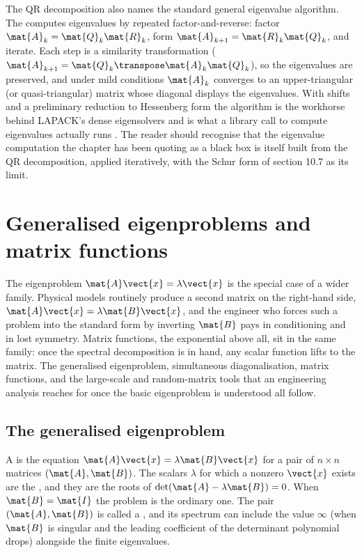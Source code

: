 The QR decomposition also names the standard general eigenvalue
algorithm. The  computes eigenvalues by
repeated factor-and-reverse: factor $\mat{A}_{k} = \mat{Q}_{k}
\mat{R}_{k}$, form $\mat{A}_{k+1} = \mat{R}_{k} \mat{Q}_{k}$, and
iterate. Each step is a similarity transformation ($\mat{A}_{k+1} =
\mat{Q}_{k}\transpose \mat{A}_{k} \mat{Q}_{k}$), so the eigenvalues
are preserved, and under mild conditions $\mat{A}_{k}$ converges to
an upper-triangular (or quasi-triangular) matrix whose diagonal
displays the eigenvalues. With shifts and a preliminary reduction to
Hessenberg form the algorithm is the workhorse behind LAPACK's dense
eigensolvers and is what a library call to compute eigenvalues
actually runs \cite[ch.~28-29]{text:trefethen-bau1997}. The reader
should recognise that the eigenvalue computation the chapter has
been quoting as a black box is itself built from the QR
decomposition, applied iteratively, with the Schur form of section
10.7 as its limit.

\section{Generalised eigenproblems and matrix functions}

The eigenproblem $\mat{A}\vect{x} = \lambda\vect{x}$ is the special
case of a wider family. Physical models routinely produce a second
matrix on the right-hand side, $\mat{A}\vect{x} = \lambda\mat{B}\vect{x}$,
and the engineer who forces such a problem into the standard form by
inverting $\mat{B}$ pays in conditioning and in lost symmetry. Matrix
functions, the exponential above all, sit in the same family: once the
spectral decomposition is in hand, any scalar function lifts to the
matrix. The generalised eigenproblem, simultaneous diagonalisation,
matrix functions, and the large-scale and random-matrix tools that an
engineering analysis reaches for once the basic eigenproblem is
understood all follow.

\subsection{The generalised eigenproblem}

A  is the equation
$\mat{A}\vect{x} = \lambda\mat{B}\vect{x}$ for a pair of $n \times n$
matrices $(\mat{A}, \mat{B})$. The scalars $\lambda$ for which a nonzero
$\vect{x}$ exists are the , and they
are the roots of $\det(\mat{A} - \lambda\mat{B}) = 0$. When $\mat{B} =
\mat{I}$ the problem is the ordinary one. The pair $(\mat{A}, \mat{B})$
is called a , and its spectrum can include the
value $\infty$ (when $\mat{B}$ is singular and the leading coefficient
of the determinant polynomial drops) alongside the finite eigenvalues.

